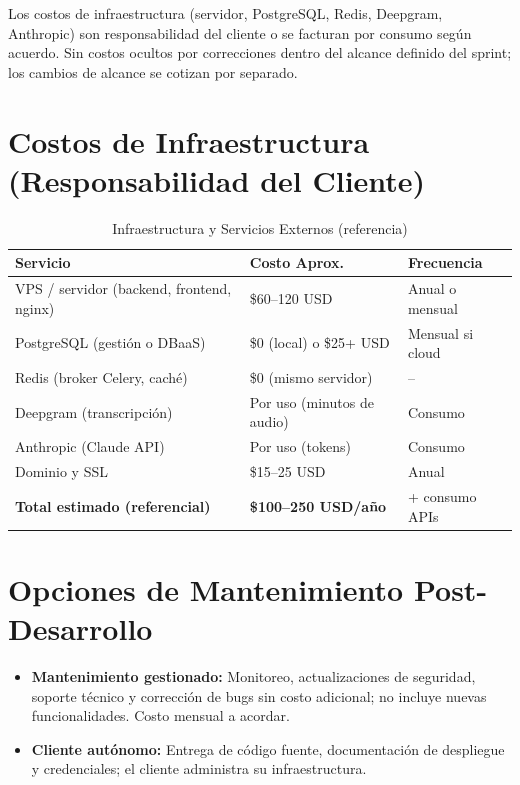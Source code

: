 \documentclass[12pt,a4paper]{report}
\begin{document}
Los costos de infraestructura (servidor, PostgreSQL, Redis, Deepgram, Anthropic) son responsabilidad del cliente o se facturan por consumo según acuerdo. Sin costos ocultos por correcciones dentro del alcance definido del sprint; los cambios de alcance se cotizan por separado.

\section{Costos de Infraestructura (Responsabilidad del Cliente)}

\begin{table}[H]
\centering
\small
\begin{tabular}{|p{4.5cm}|p{3.5cm}|p{4cm}|}
\hline
\rowcolor{primaryblue!20}
\textbf{Servicio} & \textbf{Costo Aprox.} & \textbf{Frecuencia} \\
\hline
VPS / servidor (backend, frontend, nginx) & \$60--120 USD & Anual o mensual \\
\hline
PostgreSQL (gestión o DBaaS) & \$0 (local) o \$25+ USD & Mensual si cloud \\
\hline
Redis (broker Celery, caché) & \$0 (mismo servidor) & -- \\
\hline
Deepgram (transcripción) & Por uso (minutos de audio) & Consumo \\
\hline
Anthropic (Claude API) & Por uso (tokens) & Consumo \\
\hline
Dominio y SSL & \$15--25 USD & Anual \\
\hline
\rowcolor{secondarygreen!20}
\textbf{Total estimado (referencial)} & \textbf{\$100--250 USD/año} & + consumo APIs \\
\hline
\end{tabular}
\caption{Infraestructura y Servicios Externos (referencia)}
\end{table}

\section{Opciones de Mantenimiento Post-Desarrollo}

\begin{itemize}
    \item \textbf{Mantenimiento gestionado:} Monitoreo, actualizaciones de seguridad, soporte técnico y corrección de bugs sin costo adicional; no incluye nuevas funcionalidades. Costo mensual a acordar.
    \item \textbf{Cliente autónomo:} Entrega de código fuente, documentación de despliegue y credenciales; el cliente administra su infraestructura.
\end{itemize}
\end{document}
